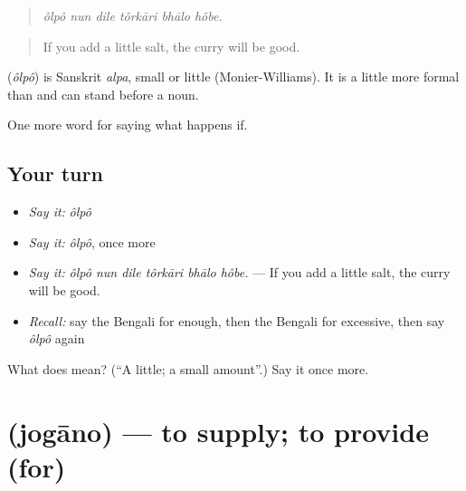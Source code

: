 \begin{quote}
     
\end{quote}

\begin{quote}
\emph{ôlpô nun dile tôrkāri bhālo hôbe.}
\end{quote}

\begin{quote}
If you add a little salt, the curry will be good.
\end{quote}

\begin{cousinweb}
\textbf{} (\emph{ôlpô}) is Sanskrit \emph{alpa}, small or little (Monier-Williams). It is a little more formal than  and can stand before a noun.
\end{cousinweb}

\begin{grammarlens}[title={What you've built}]
One more word for saying what happens if.
\end{grammarlens}

\subsection*{Your turn}
\begin{itemize}
\raggedright
  \item \emph{Say it:} \emph{ôlpô}
  \item \emph{Say it:} \emph{ôlpô}, once more
  \item \emph{Say it:} \emph{ôlpô nun dile tôrkāri bhālo hôbe.} — If you add a little salt, the curry will be good.
  \item \emph{Recall:} say the Bengali for enough, then the Bengali for excessive, then say \emph{ôlpô} again
\end{itemize}

\begin{tcolorbox}[breakable,colback=teal!4,colframe=teal!35!black,title={Before you move on}]
What does  mean? (\textquotedblleft{}A little; a small amount\textquotedblright{}.) Say it once more.
\end{tcolorbox}
\section[\texorpdfstring{\bn{জোগানো} (jogāno)}{জোগানো (jogāno)}]{ (jogāno) — to supply; to provide (for)}

\label{lesson:BN-C371-jogano}



